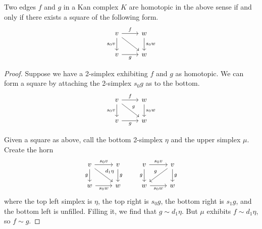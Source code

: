 \documentclass[main.tex]{subfiles}
\begin{document}
\begin{theorem}
  \label{thm:equivalent_definition_of_homotopy_of_edges}
  Two edges $f$ and $g$ in a Kan complex $K$ are homotopic in the above sense if and only if there exists a square of the following form.
  \begin{equation*}
    \begin{tikzcd}
      v
      \arrow[r, "f"]
      \arrow[d, swap, "s_{0}v"]
      \arrow[dr]
      & w
      \arrow[d, "s_{0}w"]
      \\
      v
      \arrow[r, swap, "g"]
      & w
    \end{tikzcd}
  \end{equation*}
\end{theorem}
\begin{proof}
  Suppose we have a 2-simplex exhibiting $f$ and $g$ as homotopic. We can form a square by attaching the 2-simplex $s_{0}g$ as to the bottom.
  \begin{equation*}
    \begin{tikzcd}
      v
      \arrow[r, "f"]
      \arrow[d, swap, "s_{0}v"]
      \arrow[dr, "g"]
      & w
      \arrow[d, "s_{0}w"]
      \\
      v
      \arrow[r, swap, "g"]
      & w
    \end{tikzcd}
  \end{equation*}

  Given a square as above, call the bottom 2-simplex $\eta$ and the upper simplex $\mu$. Create the horn
  \begin{equation*}
    \begin{tikzcd}
      v
      \arrow[r, "s_{0}v"]
      \arrow[dr, "d_{1}\eta"]
      \arrow[d, swap, "g"]
      & v
      \arrow[d, "g"]
      \\
      w
      \arrow[r, swap, "s_{0}w"]
      & w
    \end{tikzcd}
    \qquad
    \begin{tikzcd}
      v
      \arrow[r, "s_{0}v"]
      \arrow[d, swap, "g"]
      & v
      \arrow[dl, swap, "g"]
      \arrow[d, "g"]
      \\
      w
      \arrow[r, swap, "s_{0}w"]
      & w
    \end{tikzcd}
  \end{equation*}
  where the top left simplex is $\eta$, the top right is $s_{0}g$, the bottom right is $s_{1}g$, and the bottom left is unfilled. Filling it, we find that $g \sim d_{1}\eta$. But $\mu$ exhibits $f \sim d_{1}\eta$, so $f \sim g$.
\end{proof}
\end{document}
